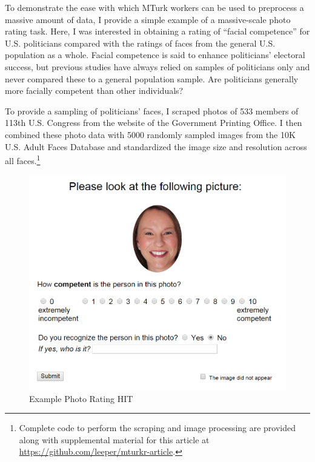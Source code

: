 To demonstrate the ease with which MTurk workers can be used to preprocess a massive amount of data, I provide a simple example of a massive-scale photo rating task. Here, I was interested in obtaining a rating of ``facial competence'' for U.S. politicians compared with the ratings of faces from the general U.S. population as a whole. Facial competence is said to enhance politicians' electoral success, but previous studies have always relied on samples of politicians only and never compared these to a general population sample. Are politicians generally more facially competent than other individuals?

To provide a sampling of politicians' faces, I scraped photos of 533 members of 113th U.S. Congress from the website of the Government Printing Office. I then combined these photo data with 5000 randomly sampled images from the 10K U.S. Adult Faces Database \citep{BainbridgeIsolaOliva2013} and standardized the image size and resolution across all faces.\footnote{Complete code to perform the scraping and image processing are provided along with supplemental material for this article at \url{https://github.com/leeper/mturkr-article}.}

\begin{figure}
\begin{center}
\includegraphics[width=\textwidth]{hit2}
\end{center}
\caption{Example Photo Rating HIT}\label{fig:hit2}
\end{figure}

